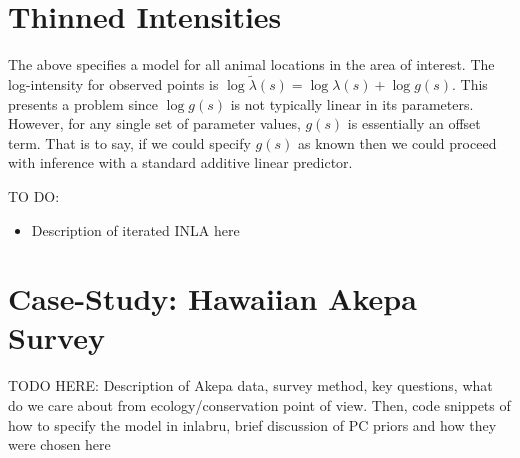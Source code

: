 \documentclass[preprint,12pt]{elsarticle}
\newcommand{\tl}{\tilde{\lambda}}   %
\begin{document}
\section*{Thinned Intensities}

The above specifies a model for all animal locations in the area of interest.  The log-intensity for observed points is $\log\tl(s) = \log\lambda(s) + \log g(s)$.  This presents a problem since $\log g(s)$ is not typically linear in its parameters. However, for any single set of parameter values, $g(s)$ is essentially an offset term.  That is to say, if we could specify $g(s)$ as known then we could proceed with inference with a standard additive linear predictor.

TO DO:

\begin{itemize}
 \item Description of iterated INLA here
\end{itemize}


\newpage

\section*{Case-Study:  Hawaiian Akepa Survey}


TODO HERE:  Description of Akepa data, survey method, key questions, what do we care about from ecology/conservation point of view.  Then, code snippets of how to specify the model in inlabru, brief discussion of PC priors and how they were chosen here


\bigskip
\end{document}

